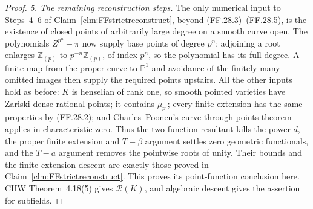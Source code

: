 \begin{proof}
\emph{5. The remaining reconstruction steps.}
The only numerical input to Steps~4--6 of
Claim~\ref{clm:FFstrictreconstruct}, beyond
(FF.28.3)--(FF.28.5), is the existence of closed
points of arbitrarily large degree on a smooth
curve open. The polynomials
\(Z^{p^n}-\pi\) now supply base points of degree
\(p^n\): adjoining a root enlarges
\(\mathbb Z_{(p)}\) to
\(p^{-n}\mathbb Z_{(p)}\), of index \(p^n\),
so the polynomial has its full degree. A finite
map from the proper curve to \(\mathbb P^1\)
and avoidance of the finitely many omitted images
then supply the required points upstairs.
All the other inputs hold as before: \(K\) is
henselian of rank one, so smooth pointed varieties
have Zariski-dense rational points; it contains
\(\mu_{p'}\); every finite extension has the same
properties by (FF.28.2); and Charles--Poonen's
curve-through-points theorem applies in
characteristic zero. Thus the two-function
resultant kills the power \(d\), the proper
finite extension and \(T-\beta\) argument settles
zero geometric functionals, and the \(T-a\)
argument removes the pointwise roots of unity.
Their bounds and the finite-extension descent are
exactly those proved in
Claim~\ref{clm:FFstrictreconstruct}. This proves
its point-function conclusion here. CHW
Theorem~4.18(5) gives \(\mathcal R(K)\), and
algebraic descent gives the assertion for subfields.
\end{proof}

